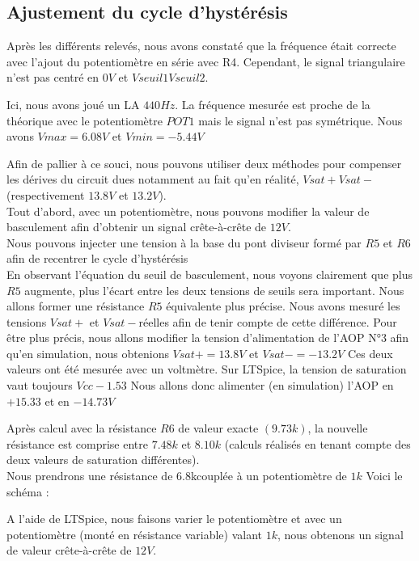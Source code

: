 {\subsection{Ajustement du cycle d’hystérésis}
Après les différents relevés, nous avons constaté que la fréquence était correcte avec l’ajout du potentiomètre en série avec R4. 
Cependant, le signal triangulaire n’est pas centré en $0V$ 
et $Vseuil1Vseuil2$.


Ici, nous avons joué un LA $440 Hz$. La fréquence mesurée est proche de la théorique avec le potentiomètre $POT1$ mais le signal n’est pas symétrique. 
Nous avons $Vmax=6.08V$ et $Vmin=-5.44V$





Afin de pallier à ce souci, nous pouvons utiliser deux méthodes pour compenser les dérives du circuit dues notamment au fait qu’en réalité, $Vsat+Vsat-$ 
(respectivement $13.8V$ et $13.2V$). \\
Tout d’abord, avec un potentiomètre, nous pouvons modifier la valeur de basculement afin d’obtenir un signal crête-à-crête de $12V$. \\

Nous pouvons injecter une tension à la base du pont diviseur formé par $R5$ et $R6$ afin de recentrer le cycle d’hystérésis\\

En observant l’équation du seuil de basculement, nous voyons clairement que plus $R5$ augmente, plus l'écart entre les deux tensions de seuils sera important.
Nous allons former une résistance $R5$ équivalente plus précise.
Nous avons mesuré les tensions $Vsat+$ et $Vsat-$réelles afin de tenir compte de cette différence. 
Pour être plus précis, nous allons modifier la tension d’alimentation de l’AOP N°3 afin qu’en simulation, nous obtenions $Vsat+=13.8V$ et $Vsat-=-13.2V$
Ces deux valeurs ont été mesurée avec un voltmètre.
Sur LTSpice, la tension de saturation vaut toujours $Vcc-1.53$
Nous allons donc alimenter (en simulation) l’AOP en $+15.33$ et en $-14.73V$

Après calcul avec la résistance $R6$ de valeur exacte $(9.73k)$, la nouvelle résistance est  comprise entre $7.48k$ et $8.10k$ 
(calculs réalisés en tenant compte des deux valeurs de saturation différentes). \\

Nous prendrons une résistance de 6.8kcouplée à un potentiomètre de $1k$
Voici le schéma :

A l’aide de LTSpice, nous faisons varier le potentiomètre et avec un potentiomètre (monté en résistance variable) valant $1k$, nous obtenons un signal 
de valeur crête-à-crête de $12V$.\\


}
